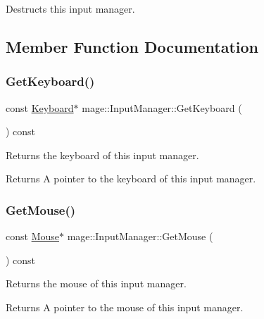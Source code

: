 Destructs this input manager. 

\subsection{Member Function Documentation}
\hypertarget{classmage_1_1_input_manager_a5b72139e30d1f3da6cda50f2989c1350}{}\label{classmage_1_1_input_manager_a5b72139e30d1f3da6cda50f2989c1350} 
\subsubsection{\texorpdfstring{Get\+Keyboard()}{GetKeyboard()}}
{\footnotesize\ttfamily const \hyperlink{classmage_1_1_keyboard}{Keyboard}$\ast$ mage\+::\+Input\+Manager\+::\+Get\+Keyboard (\begin{DoxyParamCaption}{ }\end{DoxyParamCaption}) const}

Returns the keyboard of this input manager.

\begin{DoxyReturn}{Returns}
A pointer to the keyboard of this input manager. 
\end{DoxyReturn}
\hypertarget{classmage_1_1_input_manager_ad268916e07f44e40bf267efa0e673186}{}\label{classmage_1_1_input_manager_ad268916e07f44e40bf267efa0e673186} 
\subsubsection{\texorpdfstring{Get\+Mouse()}{GetMouse()}}
{\footnotesize\ttfamily const \hyperlink{classmage_1_1_mouse}{Mouse}$\ast$ mage\+::\+Input\+Manager\+::\+Get\+Mouse (\begin{DoxyParamCaption}{ }\end{DoxyParamCaption}) const}

Returns the mouse of this input manager.

\begin{DoxyReturn}{Returns}
A pointer to the mouse of this input manager. 
\end{DoxyReturn}
\hypertarget{classmage_1_1_input_manager_aaee6f1acc558620d2cf6313f3eb36a35}{}\label{classmage_1_1_input_manager_aaee6f1acc558620d2cf6313f3eb36a35} 
